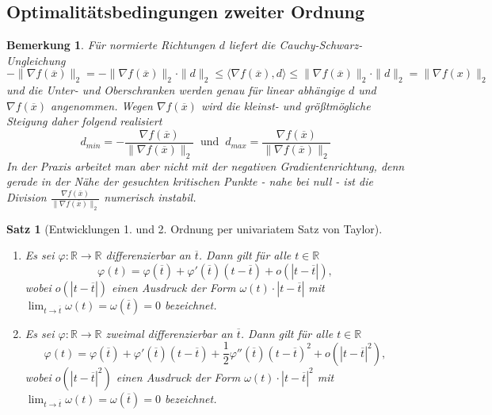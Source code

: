 \documentclass[11pt]{scrreprt}
\newcounter{thm}
\theoremstyle{thmstyle}
\numberwithin{thm}{section}
\newtheorem{satz}[thm]{Satz}
\newtheorem*{bemerkung*}{Bemerkung}
\begin{document}
\subsection*{Optimalitätsbedingungen zweiter Ordnung}

\begin{bemerkung*}
	Für normierte Richtungen $d$ liefert die Cauchy-Schwarz-Ungleichung 
	$$ - \| \nabla f(\overline{x}) \|_2 = -  \| \nabla f(\overline{x}) \|_2 \cdot \| d \|_2 \leq \langle \nabla f(\overline{x}), d \rangle \leq \| \nabla f(\overline{x}) \|_2 \cdot \| d \|_2 = \| \nabla f(x) \|_2 $$
	und die Unter- und Oberschranken werden genau für linear abhängige $d$ und $\nabla f(\overline{x})$ angenommen. Wegen $\nabla f(\overline{x})$ wird die kleinst- und größtmögliche Steigung daher folgend realisiert
	$$ d_{min} = - \frac{\nabla f(\overline{x})}{\| \nabla f(\overline{x}) \|_2} ~\text{ und }~ d_{max} = \frac{\nabla f(\overline{x})}{\| \nabla f(\overline{x}) \|_2}  $$	
	In der Praxis arbeitet man aber nicht mit der negativen Gradientenrichtung, denn gerade in der Nähe der gesuchten kritischen Punkte - nahe bei null - ist die Division $\frac{\nabla f(\overline{x})}{\| \nabla f(\overline{x}) \|_2}$ numerisch instabil.
\end{bemerkung*}

\begin{satz}[Entwicklungen 1. und 2. Ordnung per univariatem Satz von Taylor] ~\
	\begin{enumerate}[label=\alph*\upshape)]
		\item Es sei $\varphi \colon \mathbb{R} \rightarrow \mathbb{R}$ differenzierbar an $\overline{t}$. Dann gilt für alle $t \in \mathbb{R}$
			$$ \varphi(t) = \varphi(\overline{t}) + \varphi'(\overline{t})(t-\overline{t}) + o(|t - \overline{t}|), $$
			wobei $o(|t-\overline{t}|)$ einen Ausdruck der Form $\omega(t) \cdot |t-\overline{t}|$ mit $\lim_{t \rightarrow \overline{t}} \omega(t) = \omega(\overline{t}) = 0$ bezeichnet.
		\item Es sei $\varphi \colon \mathbb{R} \rightarrow \mathbb{R}$ zweimal differenzierbar an $\overline{t}$. Dann gilt für alle $t \in \mathbb{R}$
			$$\varphi(t) = \varphi(\overline{t}) + \varphi'(\overline{t})(t - \overline{t}) + \frac{1}{2} \varphi''(\overline{t})(t-\overline{t})^2 + o(|t-\overline{t}|^2), $$
			wobei $o(|t-\overline{t}|^2)$ einen Ausdruck der Form $\omega(t) \cdot |t-\overline{t}|^2$ mit $\lim_{t \rightarrow \overline{t}} \omega(t) = \omega(\overline{t}) = 0$ bezeichnet.
	\end{enumerate}
\end{satz}
\end{document}
